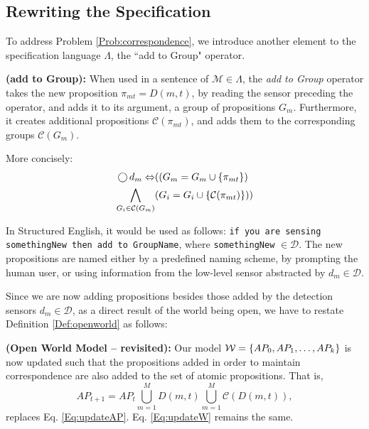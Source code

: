 \subsection{Rewriting the Specification} %

To address Problem \ref{Prob:correspondence}, we introduce another element to the specification language $\Lambda$, the ``add to Group" operator.

\begin{myDefinition}\label{Def:addto}
	\textbf{(add to Group):} When used in a sentence of $\mathcal{M} \in \Lambda$, the \emph{add to Group} operator takes the new proposition $\pi_{mt} = D(m,t)$, by reading the sensor preceding the operator, and adds it to its argument, a group of propositions $G_m$. 
	Furthermore, it creates additional propositions $\mathcal{C}(\pi_{mt})$, and adds them to the corresponding groups $\mathcal{C}(G_m)$. 
	
	More concisely:
	\begin{equation}
	\begin{split}
		\operatorname{\bigcirc} d_m \Leftrightarrow &((G_m = G_m \cup \left\{ \pi_{mt} \right\}) \\
		\bigwedge_{G_i \in \mathcal{C}(G_m)} &(G_i = G_i \cup \left\{ \mathcal{C}(\pi_{mt}) \right\}))
	\end{split}
	\end{equation}
\end{myDefinition}
In Structured English, it would be used as follows: \texttt{if you are sensing somethingNew then add to GroupName}, where \texttt{somethingNew} $\in \mathcal{D}$. The new propositions are named either by a predefined naming scheme, by prompting the human user, or using information from the low-level sensor abstracted by $d_m \in \mathcal{D}$.

Since we are now adding propositions besides those added by the detection sensors $d_m \in \mathcal{D}$, as a direct result of the world being open, we have to restate Definition \ref{Def:openworld} as follows:

\begin{myDefinition}\label{Def:openworld2}	
	\textbf{(Open World Model -- revisited):} Our model $\mathcal{W} = \left\{ AP_0, AP_1, \ldots, AP_k \right\}$ is now updated such that the propositions added in order to maintain correspondence are also added to the set of atomic propositions. That is, 
	\begin{equation}\label{Eq:updateAP2}
		AP_{t+1} = AP_t \bigcup_{m=1}^{M}D(m, t) \bigcup_{m=1}^{M}\mathcal{C}(D(m, t)),
	\end{equation}
	replaces Eq. \eqref{Eq:updateAP}. Eq. \eqref{Eq:updateW} remains the same.
\end{myDefinition}

